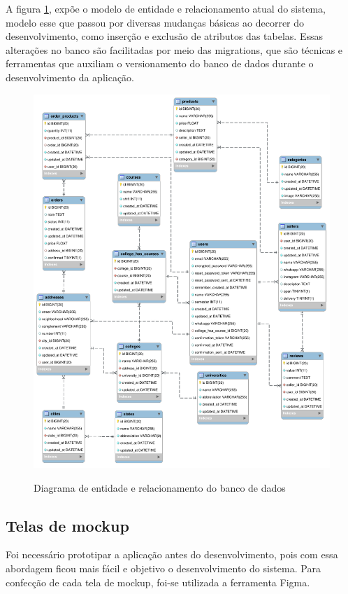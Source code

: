 A figura \ref{fig:err}, expõe o modelo de entidade e relacionamento atual do sistema, modelo esse que passou por diversas mudanças básicas ao decorrer do desenvolvimento, como inserção e exclusão de atributos das tabelas. Essas alterações no banco são facilitadas por meio das migrations, que são técnicas e ferramentas que auxiliam o versionamento do banco de dados durante o desenvolvimento da aplicação.

\begin{figure}[htbp!]
  \centering
  \caption{Diagrama de entidade e relacionamento do banco de dados}
  \includegraphics[width=1\textwidth]{figs/err.png}
    \label{fig:err}
\end{figure}

\subsection{Telas de mockup}
Foi necessário prototipar a aplicação antes do desenvolvimento, pois com essa abordagem ficou mais fácil e objetivo o desenvolvimento do sistema. Para confecção de cada tela de mockup, foi-se utilizada a ferramenta Figma.

